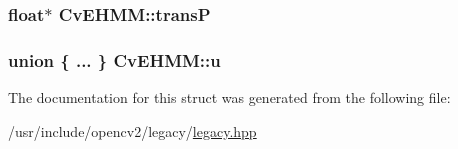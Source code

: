 \hypertarget{structCvEHMM_a380235219abbd662f98358d9ae7095db}{
\subsubsection[{trans\-P}]{\setlength{\rightskip}{0pt plus 5cm}float$\ast$ Cv\-E\-H\-M\-M\-::trans\-P}}\label{structCvEHMM_a380235219abbd662f98358d9ae7095db}
\hypertarget{structCvEHMM_a5a617a42b4d79f02f8b0d55ac0ba5106}{
\subsubsection[{u}]{\setlength{\rightskip}{0pt plus 5cm}union \{ ... \}   Cv\-E\-H\-M\-M\-::u}}\label{structCvEHMM_a5a617a42b4d79f02f8b0d55ac0ba5106}


The documentation for this struct was generated from the following file\-:\begin{DoxyCompactItemize}
\item 
/usr/include/opencv2/legacy/\hyperlink{legacy_8hpp}{legacy.\-hpp}\end{DoxyCompactItemize}
